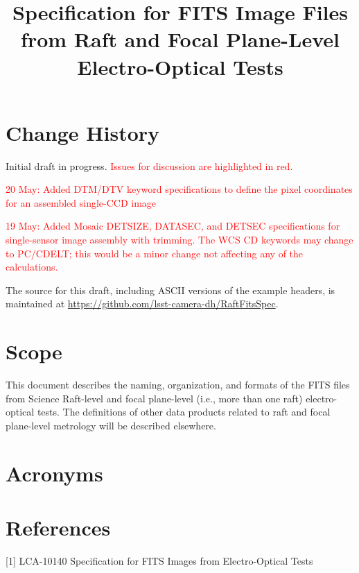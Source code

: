 \documentclass{article}[12pt]
\title{Specification for FITS Image Files from Raft and Focal Plane-Level Electro-Optical Tests}
\newcommand{\red}{\textcolor{red}}
\begin{document}
\maketitle
\tableofcontents
\newpage
\listoftables

\section{Change History}
Initial draft in progress.  \red{Issues for discussion are highlighted in red.}

\red{20 May:  Added DTM/DTV keyword specifications to define the pixel coordinates for an assembled single-CCD image}

\red{19 May:  Added Mosaic DETSIZE, DATASEC, and DETSEC specifications for single-sensor image assembly with trimming.  The WCS CD keywords may change to PC/CDELT; this would be a minor change not affecting any of the calculations.}

The source for this draft, including ASCII versions of the example headers, is maintained at \url{https://github.com/lsst-camera-dh/RaftFitsSpec}.

\section{Scope}
This document describes the naming, organization, and formats of the FITS files from Science Raft-level and focal plane-level (i.e., more than one raft) electro-optical tests.  The definitions of other data products related to raft and focal plane-level metrology will be described elsewhere.

\section{Acronyms}

\section{References}

[1] LCA-10140 Specification for FITS Images from Electro-Optical Tests



\end{document}
